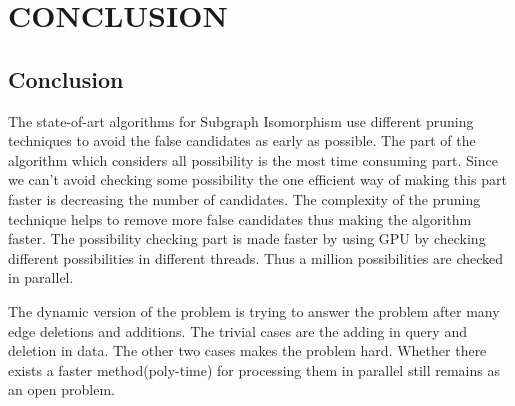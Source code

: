 \chapter{CONCLUSION}
\label{chap:concl}

\section{Conclusion}

\hspace{10mm} The state-of-art algorithms for Subgraph Isomorphism use different pruning techniques to avoid the false candidates as early as possible.  The part of the algorithm which considers all possibility is the most time consuming part. Since we can't avoid checking some possibility the one efficient way of making this part faster is decreasing the number of candidates. The complexity of the pruning technique helps to remove more false candidates thus  making the algorithm faster. The possibility checking part is made faster by using GPU by checking different possibilities in different threads. Thus a million possibilities are checked in parallel.

\hspace{10mm}The dynamic version of the problem is trying to answer the problem after many edge deletions and additions. The trivial cases are the adding in query and deletion in data. The other two cases makes the problem hard. Whether there exists a faster method(poly-time) for processing them in parallel still remains as an open problem. 


